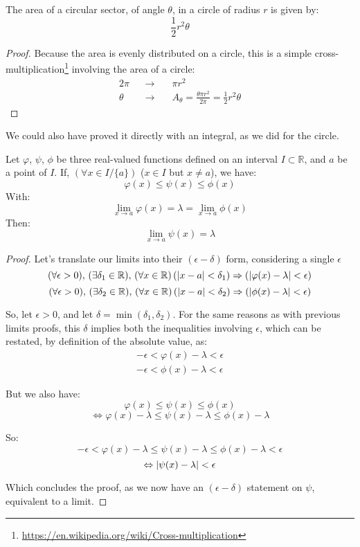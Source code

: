 \documentclass[solutions.tex]{subfiles}
\begin{document}
\begin{theorem} The area of a circular
sector, of angle $\theta$, in a circle of radius $r$ is given
by:
\[ \boxed{\frac12r^2\theta} \]
\end{theorem}
\begin{proof} Because the area is evenly distributed on a circle,
this is a simple cross-multiplication\footnote{
\url{https://en.wikipedia.org/wiki/Cross-multiplication}} involving
the area of a circle:
\begin{equation*} \begin{aligned}
	2\pi &&\rightarrow\quad& \pi r^2 \\
	\theta &&\rightarrow\quad& A_\theta= \frac{\theta\pi r^2}{2\pi}
		= \boxed{\frac12r^2\theta}
\end{aligned} \end{equation*}
\end{proof}
\begin{remark} We could also have proved it directly with an integral,
as we did for the circle.
\end{remark}

\begin{theorem} Let $\varphi$, $\psi$, $\phi$ be three
real-valued functions defined on an interval $I\subset\mathbb{R}$, and
$a$ be a point of $I$. If, $(\forall x \in I/\{a\})$ ($x\in I$ but $x\neq a$),
we have:
\[
	\varphi(x) \le \psi(x) \le \phi(x)
\]
With:
\[
	\lim_{x\rightarrow a} \varphi(x) = \lambda = \lim_{x\rightarrow a}\phi(x)
\]
Then:
\[
	\boxed{\lim_{x\rightarrow a}\psi(x) = \lambda}
\]
\end{theorem}
\begin{proof}
Let's translate our limits into their $(\epsilon-\delta)$ form,
considering a single $\epsilon$
\[ \epsdelta{\epsilon}{\delta_1}{a}{x}{\varphi(x)}{\lambda}  \]
\[ \epsdelta{\epsilon}{\delta_2}{a}{x}{\phi(x)}{\lambda}     \]

So, let $\epsilon >0$, and let $\delta=\min(\delta_1,\delta_2)$. For
the same reasons as with previous limits proofs, this $\delta$ implies
both the inequalities involving $\epsilon$, which can be restated, by
definition of the absolute value, as:
\begin{equation*} \begin{aligned}
	-\epsilon < \varphi(x)-\lambda < \epsilon \\
	-\epsilon < \phi(x)-\lambda < \epsilon
\end{aligned} \end{equation*}

But we also have:
\[ \varphi(x) \le \psi(x) \le \phi(x) \]
\[ \Leftrightarrow \varphi(x)-\lambda \le \psi(x)-\lambda \le \phi(x)-\lambda \]

So:
\[ -\epsilon < \varphi(x)-\lambda \le \psi(x)-\lambda \le \phi(x)-\lambda < \epsilon \]
\[ \Leftrightarrow \abs{\psi(x)-\lambda} < \epsilon \]

Which concludes the proof, as we now have an $(\epsilon-\delta)$ statement
on $\psi$, equivalent to a limit.

\end{proof}
\end{document}
